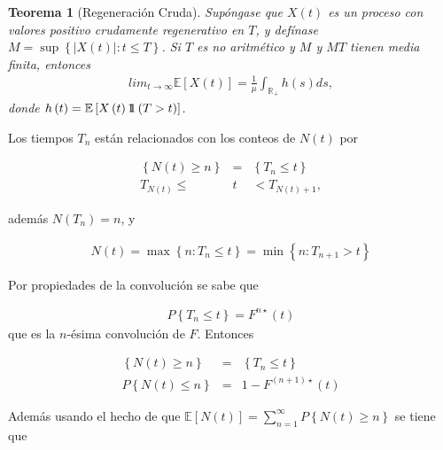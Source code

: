 \documentclass{article}
\newtheorem{Teo}{Teorema}[section]
\newcommand{\rea}{\mathbb{R}}
\newcommand{\esp}{\mathbb{E}}
\newcommand{\indora}{\mbox{$1$\hspace{-0.8ex}$1$}}
\numberwithin{equation}{section}
\begin{document}
{\begin{Teo}[Regeneraci\'on Cruda]
Sup\'ongase que $X\left(t\right)$ es un proceso con valores positivo crudamente regenerativo en $T$, y def\'inase $M=\sup\left\{|X\left(t\right)|:t\leq T\right\}$. Si $T$ es no aritm\'etico y $M$ y $MT$ tienen media finita, entonces
\begin{eqnarray*}
lim_{t\rightarrow\infty}\esp\left[X\left(t\right)\right]=\frac{1}{\mu}\int_{\rea_{+}}h\left(s\right)ds,
\end{eqnarray*}
donde $h\left(t\right)=\esp\left[X\left(t\right)\indora\left(T>t\right)\right]$.
\end{Teo}

%
%

Los tiempos $T_{n}$ est\'an relacionados con los conteos de $N\left(t\right)$ por

\begin{eqnarray*}
\left\{N\left(t\right)\geq n\right\}&=&\left\{T_{n}\leq t\right\}\\
T_{N\left(t\right)}\leq &t&<T_{N\left(t\right)+1},
\end{eqnarray*}

adem\'as $N\left(T_{n}\right)=n$, y 

\begin{eqnarray*}
N\left(t\right)=\max\left\{n:T_{n}\leq t\right\}=\min\left\{n:T_{n+1}>t\right\}
\end{eqnarray*}

Por propiedades de la convoluci\'on se sabe que

\begin{eqnarray*}
P\left\{T_{n}\leq t\right\}=F^{n\star}\left(t\right)
\end{eqnarray*}
que es la $n$-\'esima convoluci\'on de $F$. Entonces 

\begin{eqnarray*}
\left\{N\left(t\right)\geq n\right\}&=&\left\{T_{n}\leq t\right\}\\
P\left\{N\left(t\right)\leq n\right\}&=&1-F^{\left(n+1\right)\star}\left(t\right)
\end{eqnarray*}

Adem\'as usando el hecho de que $\esp\left[N\left(t\right)\right]=\sum_{n=1}^{\infty}P\left\{N\left(t\right)\geq n\right\}$
se tiene que

}
\end{document}
